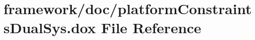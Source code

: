 \hypertarget{platform_constraints_dual_sys_8dox}{}\section{framework/doc/platform\+Constraints\+Dual\+Sys.dox File Reference}
\label{platform_constraints_dual_sys_8dox}
